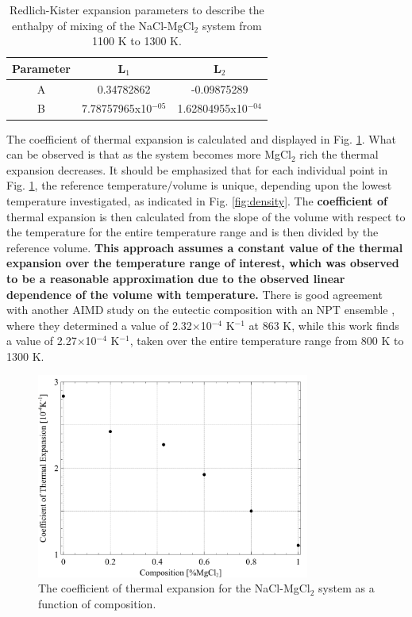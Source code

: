 \documentclass[review]{elsarticle}
\providecommand{\DIFaddtex}[1]{{\bf #1}} %
\providecommand{\DIFdeltex}[1]{} %
\providecommand{\DIFaddbegin}{\protect\color{blue}} %
\providecommand{\DIFaddend}{\protect\color{black}} %
\providecommand{\DIFaddFL}[1]{\DIFadd{#1}} %
\providecommand{\DIFdelFL}[1]{\DIFdel{#1}} %
\providecommand{\DIFaddbeginFL}{} %
\providecommand{\DIFaddendFL}{} %
\providecommand{\DIFdelbeginFL}{} %
\providecommand{\DIFdelendFL}{} %
\providecommand{\DIFadd}[1]{\texorpdfstring{\DIFaddtex{#1}}{#1}} %
\providecommand{\DIFdel}[1]{\texorpdfstring{\DIFdeltex{#1}}{}} %
\newcommand{\DIFscaledelfig}{0.5}
\newlength{\DIFdelgraphicswidth} %
\newlength{\DIFdelgraphicsheight} %
\newcommand{\DIFaddincludegraphics}[2][]{{\color{blue}\fbox{\DIFOincludegraphics[#1]{#2}}}} %
\newcommand{\DIFdelincludegraphics}[2][]{%
\sbox{\DIFdelgraphicsbox}{\DIFOincludegraphics[#1]{#2}}%
\settoboxwidth{\DIFdelgraphicswidth}{\DIFdelgraphicsbox} %
\settoboxtotalheight{\DIFdelgraphicsheight}{\DIFdelgraphicsbox} %
\scalebox{\DIFscaledelfig}{%
\parbox[b]{\DIFdelgraphicswidth}{\usebox{\DIFdelgraphicsbox}\\[-\baselineskip] \rule{\DIFdelgraphicswidth}{0em}}\llap{\resizebox{\DIFdelgraphicswidth}{\DIFdelgraphicsheight}{%
\setlength{\unitlength}{\DIFdelgraphicswidth}%
\begin{picture}(1,1)%
\thicklines\linethickness{2pt} %
{\color[rgb]{1,0,0}\put(0,0){\framebox(1,1){}}}%
{\color[rgb]{1,0,0}\put(0,0){\line( 1,1){1}}}%
{\color[rgb]{1,0,0}\put(0,1){\line(1,-1){1}}}%
\end{picture}%
}\hspace*{3pt}}} %
} %
\DeclareRobustCommand{\DIFaddbegin}{\DIFOaddbegin \let\includegraphics\DIFaddincludegraphics} %
\DeclareRobustCommand{\DIFaddend}{\DIFOaddend \let\includegraphics\DIFOincludegraphics} %
\DeclareRobustCommand{\DIFaddbeginFL}{\DIFOaddbeginFL \let\includegraphics\DIFaddincludegraphics} %
\DeclareRobustCommand{\DIFaddendFL}{\DIFOaddendFL \let\includegraphics\DIFOincludegraphics} %
\DeclareRobustCommand{\DIFdelbeginFL}{\DIFOdelbeginFL \let\includegraphics\DIFdelincludegraphics} %
\DeclareRobustCommand{\DIFdelendFL}{\DIFOaddendFL \let\includegraphics\DIFOincludegraphics} %
\begin{document}
\begin{table}[]
\centering
\caption{Redlich-Kister expansion parameters to describe the enthalpy of mixing of the NaCl-MgCl$_2$ system from 1100 K to 1300 K.}
\begin{tabular}{|c|c|c|}
\hline
Parameter & \DIFdelbeginFL \DIFdelFL{1 }\DIFdelendFL \DIFaddbeginFL \DIFaddFL{L$_1$ }\DIFaddendFL & \DIFdelbeginFL \DIFdelFL{2 }\DIFdelendFL \DIFaddbeginFL \DIFaddFL{L$_2$ }\DIFaddendFL \\
\hline

A	& 0.34782862    & -0.09875289\\
B	  & 7.78757965x10$^{-05}$   & 1.62804955x10$^{-04}$\\
\hline
\end{tabular}
\label{table:RK_en}
\end{table}

The coefficient of thermal expansion is calculated and displayed in Fig. \ref{fig:CTE}. What can be observed is that as the system becomes more MgCl$_2$ rich the thermal expansion decreases. It should be emphasized that for each individual point in Fig. \ref{fig:CTE}, the reference temperature/volume is unique, depending upon the lowest temperature investigated, as indicated in Fig. \ref{fig:density}. The \DIFaddbegin \DIFadd{coefficient of }\DIFaddend thermal expansion is then calculated from the slope of the volume with respect to the temperature for the entire temperature range and is then divided by the reference volume. \DIFaddbegin \DIFadd{This approach assumes a constant value of the thermal expansion over the temperature range of interest, which was observed to be a reasonable approximation due to the observed linear dependence of the volume with temperature. }\DIFaddend There is good agreement with another AIMD study on the eutectic composition with an NPT ensemble \cite{XU2020568}, where they determined a value of 2.32$\times$10$^{-4}$ K$^{-1}$ at 863 K, while this work finds a value of 2.27$\times$10$^{-4}$ K$^{-1}$, taken over the entire temperature range from 800 K to 1300 K. 

\begin{figure}[h]
 \centering
 \includegraphics[width=0.8\textwidth]{CTE.jpg} 
 \caption{The coefficient of thermal expansion for the NaCl-MgCl$_{2}$ system as a function of composition.}
 \label{fig:CTE}
\end{figure} 
\FloatBarrier
\end{document}
